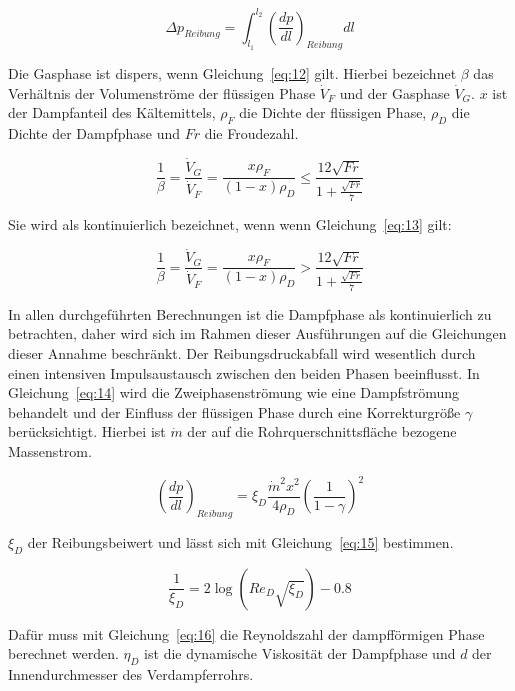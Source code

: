 \begin{equation}
\label{eq:11}
\Delta p_{Reibung} = \int_{l_1}^{l_2} \left( \frac{dp}{dl} \right)_{Reibung} dl
\end{equation}

\clearpage

Die Gasphase ist dispers, wenn Gleichung~\ref{eq:12} gilt. Hierbei bezeichnet $\beta$ das Verhältnis der Volumenströme der flüssigen Phase $\dot{V}_F$ und der Gasphase $\dot{V}_G$. $x$ ist der Dampfanteil des Kältemittels, $\rho_F$ die Dichte der flüssigen Phase, $\rho_D$ die Dichte der Dampfphase und $Fr$ die Froudezahl.

\begin{equation}
\label{eq:12}
\frac{1}{\beta} = \frac{\dot{V}_G}{\dot{V}_F} = \frac{x\rho_F}{(1-x)\rho_D} \leq \frac{12\sqrt{Fr}}{1+\frac{\sqrt{Fr}}{7}}
\end{equation}

Sie wird als kontinuierlich bezeichnet, wenn wenn Gleichung~\ref{eq:13} gilt:

\begin{equation}
\label{eq:13}
\frac{1}{\beta} = \frac{\dot{V}_G}{\dot{V}_F} = \frac{x\rho_F}{(1-x)\rho_D} > \frac{12\sqrt{Fr}}{1+\frac{\sqrt{Fr}}{7}}
\end{equation}

In allen durchgeführten Berechnungen ist die Dampfphase als kontinuierlich zu betrachten, daher wird sich im Rahmen dieser Ausführungen auf die Gleichungen dieser Annahme beschränkt. Der Reibungsdruckabfall wird wesentlich durch einen intensiven Impulsaustausch zwischen den beiden Phasen beeinflusst. In Gleichung~\ref{eq:14} wird die Zweiphasenströmung wie eine Dampfströmung behandelt und der Einfluss der flüssigen Phase durch eine Korrekturgröße $\gamma$ berücksichtigt. Hierbei ist $\dot{m}$ der auf die Rohrquerschnittsfläche bezogene Massenstrom.

\begin{equation}
\label{eq:14}
\left( \frac{dp}{dl} \right)_{Reibung} = \xi_D \frac{\dot{m}^2 x^2}{4\rho_D} \left(\frac{1}{1-\gamma} \right)^2
\end{equation}

$\xi_D$ der Reibungsbeiwert und lässt sich mit Gleichung~\ref{eq:15} bestimmen.

\begin{equation}
\label{eq:15}
\frac{1}{\xi_D} = 2\log(Re_D \sqrt{\xi_D})-0.8
\end{equation}

Dafür muss mit Gleichung~\ref{eq:16} die Reynoldszahl der dampfförmigen Phase berechnet werden. $\eta_D$ ist die dynamische Viskosität der Dampfphase und $d$ der Innendurchmesser des Verdampferrohrs.

